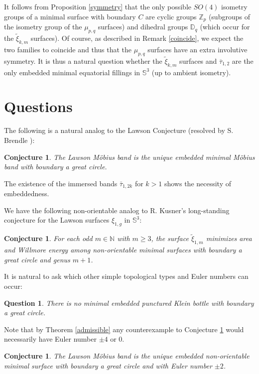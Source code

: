 \documentclass[11pt, reqno]{amsart}
\newtheorem{conj}[thm]{Conjecture}
\newtheorem{question}[thm]{Question}
\numberwithin{equation}{section}
\begin{document}
It follows from Proposition \ref{symmetry} that the only possible $SO(4)$ isometry groups of a minimal surface with boundary $C$ are cyclic groups $\mathbb{Z}_p$ (subgroups of the isometry group of the $\mu_{p,q}$ surfaces) and dihedral groups $\mathbb{D}_q$ (which occur for the $\tilde{\xi}_{k,m}$ surfaces).  Of course, as described in Remark \ref{coincide}, we expect the two families to coincide and thus that the $\mu_{p,q}$ surfaces have an extra involutive symmetry. It is thus a natural question whether the $\tilde{\xi}_{k,m}$ surfaces and $\overline{\tau}_{1,2}$ are the only embedded minimal equatorial fillings in $\mathbb{S}^3$ (up to ambient isometry).


\section{Questions}\label{questionsection}
The following is a natural analog to the Lawson Conjecture (resolved by S. Brendle \cite{B}):
\begin{conj}
The Lawson M\"obius band is the \emph{unique} embedded minimal M\"obius band with boundary a great circle.  
\end{conj}
The existence of the immersed bands $\bar{\tau}_{1,2k}$ for $k>1$ shows the necessity of embeddedness.  

We have the following non-orientable analog to R. Kusner's  long-standing conjecture for the Lawson surfaces $\xi_{1,g}$ in $\mathbb{S}^3$:
\begin{conj}
For each odd $m\in\mathbb{N}$ with $m\geq 3$, the surface $\tilde{\xi}_{1,m}$ minimizes area and Willmore energy among non-orientable minimal surfaces with boundary a great circle and genus $m+1$.
\end{conj}



It is natural to ask which other simple topological types and Euler numbers can occur:

\begin{question}\label{punctured}
There is no minimal embedded punctured Klein bottle with boundary a great circle. 
\end{question}

Note that by Theorem \ref{admissible} any counterexample to Conjecture \ref{punctured} would necessarily have Euler number $\pm 4$ or $0$.

\begin{conj}\label{2}
The Lawson M\"obius band is the \emph{unique} embedded non-orientable minimal surface with boundary a great circle and with Euler number $\pm 2$.  
\end{conj}
\end{document}

